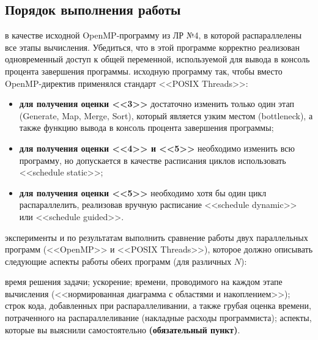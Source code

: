 \subsection{Порядок выполнения работы}
\begin{enumerate}
     в качестве исходной OpenMP-программу из ЛР №4, в которой распараллелены все этапы вычисления. Убедиться, что в этой программе корректно реализован одновременный доступ к общей переменной, используемой для вывода в консоль процента завершения программы.
     исходную программу так, чтобы вместо OpenMP-ди\-рек\-тив применялся стандарт <<POSIX Threads>>:
        \begin{itemize}
            \item\textbf{для получения оценки <<3>>} достаточно изменить только один этап (Generate, Map, Merge, Sort), который является узким местом (bottleneck), а также функцию вывода в консоль процента завершения программы;
            \item\textbf{для получения оценки <<4>> и <<5>>} необходимо изменить всю программу, но допускается в качестве расписания циклов использовать <<schedule static>>;
            \item\textbf{для получения оценки <<5>>} необходимо хотя бы один цикл распараллелить, реализовав вручную расписание <<schedule dynamic>> или <<schedule guided>>.
        \end{itemize}
     эксперименты и по результатам выполнить сравнение работы двух параллельных программ (<<OpenMP>> и <<POSIX Threads>>), которое должно описывать следующие аспекты работы обеих программ (для различных $N$):
        \begin{itemize}
             время решения задачи;
             ускорение;
             времени, проводимого на каждом этапе вычисления (<<нормированная
диаграмма с областями и накоплением>>);
             строк кода, добавленных при распараллеливании, а также грубая оценка
времени, потраченного на распараллеливание (накладные расходы программиста);
             аспекты, которые вы выяснили самостоятельно \textbf{(обязательный пункт)}.
        \end{itemize}
\end{enumerate}
